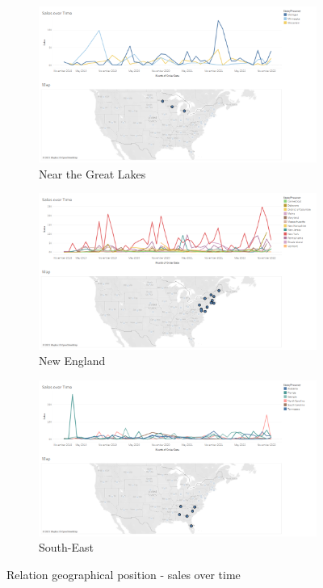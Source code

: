 \documentclass[openany]{article}
\begin{document}
\begin{figure}[h]\ContinuedFloat
\centering
	\begin{subfigure}{.8\textwidth}
		\centering
		\includegraphics[width=\linewidth]{Tableau/b_3}
		\caption{Near the Great Lakes}
	\end{subfigure}

	\begin{subfigure}{.8\textwidth}
		\centering
		\includegraphics[width=\linewidth]{Tableau/b_4}
		\caption{New England}
		\label {new_england}
	\end{subfigure}

	\begin{subfigure}{.8\textwidth}
		\centering
		\includegraphics[width=\linewidth]{Tableau/b_5}
		\caption{South-East}
	\end{subfigure}
	\caption{Relation geographical position - sales over time}
\end{figure}
\end{document}
